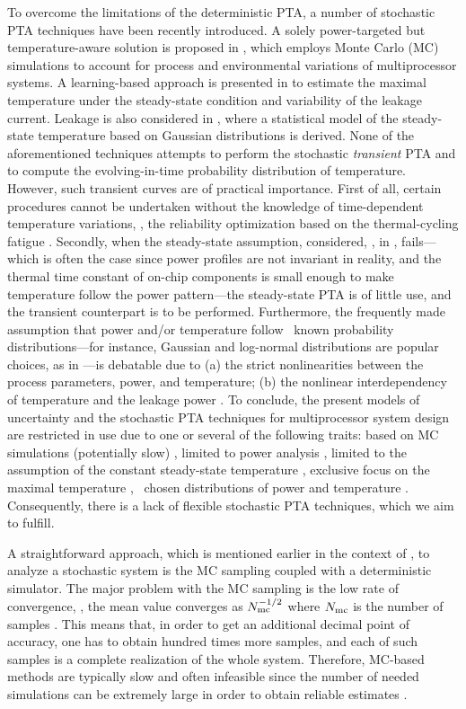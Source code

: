 To overcome the limitations of the deterministic PTA, a number of stochastic PTA techniques have been recently introduced. A solely power-targeted but temperature-aware solution is proposed in \cite{chandra2010}, which employs Monte Carlo (MC) simulations to account for process and environmental variations of multiprocessor systems. A learning-based approach is presented in \cite{juan2011} to estimate the maximal temperature under the steady-state condition and variability of the leakage current. Leakage is also considered in \cite{juan2012}, where a statistical model of the steady-state temperature based on Gaussian distributions is derived. None of the aforementioned techniques attempts to perform the stochastic \emph{transient} PTA and to compute the evolving-in-time probability distribution of temperature. However, such transient curves are of practical importance. First of all, certain procedures cannot be undertaken without the knowledge of time-dependent temperature variations, \eg, the reliability optimization based on the thermal-cycling fatigue \cite{ukhov2012}. Secondly, when the steady-state assumption, considered, \eg, in \cite{juan2011, juan2012}, fails---which is often the case since power profiles are not invariant in reality, and the thermal time constant of on-chip components is small enough to make temperature follow the power pattern---the steady-state PTA is of little use, and the transient counterpart is to be performed. Furthermore, the frequently made assumption that power and/or temperature follow \apriori\ known probability distributions---for instance, Gaussian and log-normal distributions are popular choices, as in \cite{juan2012, srivastava2010}---is debatable due to (a) the strict nonlinearities between the process parameters, power, and temperature; (b) the nonlinear interdependency of temperature and the leakage power \cite{liu2007}. To conclude, the present models of uncertainty and the stochastic PTA techniques for multiprocessor system design are restricted in use due to one or several of the following traits: based on MC simulations (potentially slow) \cite{chandra2010}, limited to power analysis \cite{chandra2010}, limited to the assumption of the constant steady-state temperature \cite{juan2011, juan2012}, exclusive focus on the maximal temperature \cite{juan2011}, \apriori\ chosen distributions of power and temperature \cite{juan2012, srivastava2010}. Consequently, there is a lack of flexible stochastic PTA techniques, which we aim to fulfill.

A straightforward approach, which is mentioned earlier in the context of \cite{chandra2010}, to analyze a stochastic system is the MC sampling coupled with a deterministic simulator. The major problem with the MC sampling is the low rate of convergence, \eg, the mean value converges as $N_\text{mc}^{-{{1}/{2}}}$ where $N_\text{mc}$ is the number of samples \cite{xiu2010, maitre2010}. This means that, in order to get an additional decimal point of accuracy, one has to obtain hundred times more samples, and each of such samples is a complete realization of the whole system. Therefore, MC-based methods are typically slow and often infeasible since the number of needed simulations can be extremely large in order to obtain reliable estimates \cite{diaz-emparanza2002}.

